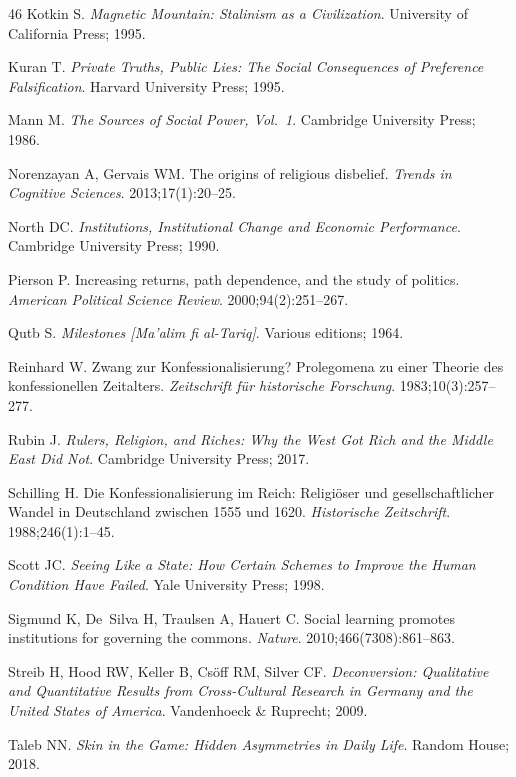 \documentclass[12pt]{article}
\begin{document}
\begin{thebibliography}{46}
Kotkin S.
\textit{Magnetic Mountain: Stalinism as a Civilization}.
University of California Press; 1995.

Kuran T.
\textit{Private Truths, Public Lies: The Social Consequences of Preference Falsification}.
Harvard University Press; 1995.

Mann M.
\textit{The Sources of Social Power, Vol.~1}.
Cambridge University Press; 1986.

Norenzayan A, Gervais WM.
The origins of religious disbelief.
\textit{Trends in Cognitive Sciences}. 2013;17(1):20--25.

North DC.
\textit{Institutions, Institutional Change and Economic Performance}.
Cambridge University Press; 1990.

Pierson P.
Increasing returns, path dependence, and the study of politics.
\textit{American Political Science Review}. 2000;94(2):251--267.

Qutb S.
\textit{Milestones [Ma'alim fi al-Tariq]}.
Various editions; 1964.

Reinhard W.
Zwang zur Konfessionalisierung? Prolegomena zu einer Theorie des konfessionellen Zeitalters.
\textit{Zeitschrift f\"{u}r historische Forschung}. 1983;10(3):257--277.

Rubin J.
\textit{Rulers, Religion, and Riches: Why the West Got Rich and the Middle East Did Not}.
Cambridge University Press; 2017.

Schilling H.
Die Konfessionalisierung im Reich: Religi\"{o}ser und gesellschaftlicher Wandel in Deutschland zwischen 1555 und 1620.
\textit{Historische Zeitschrift}. 1988;246(1):1--45.

Scott JC.
\textit{Seeing Like a State: How Certain Schemes to Improve the Human Condition Have Failed}.
Yale University Press; 1998.

Sigmund K, De~Silva H, Traulsen A, Hauert C.
Social learning promotes institutions for governing the commons.
\textit{Nature}. 2010;466(7308):861--863.

Streib H, Hood RW, Keller B, Cs\"{o}ff RM, Silver CF.
\textit{Deconversion: Qualitative and Quantitative Results from Cross-Cultural Research in Germany and the United States of America}.
Vandenhoeck \& Ruprecht; 2009.

Taleb NN.
\textit{Skin in the Game: Hidden Asymmetries in Daily Life}.
Random House; 2018.


\end{thebibliography}
\end{document}
